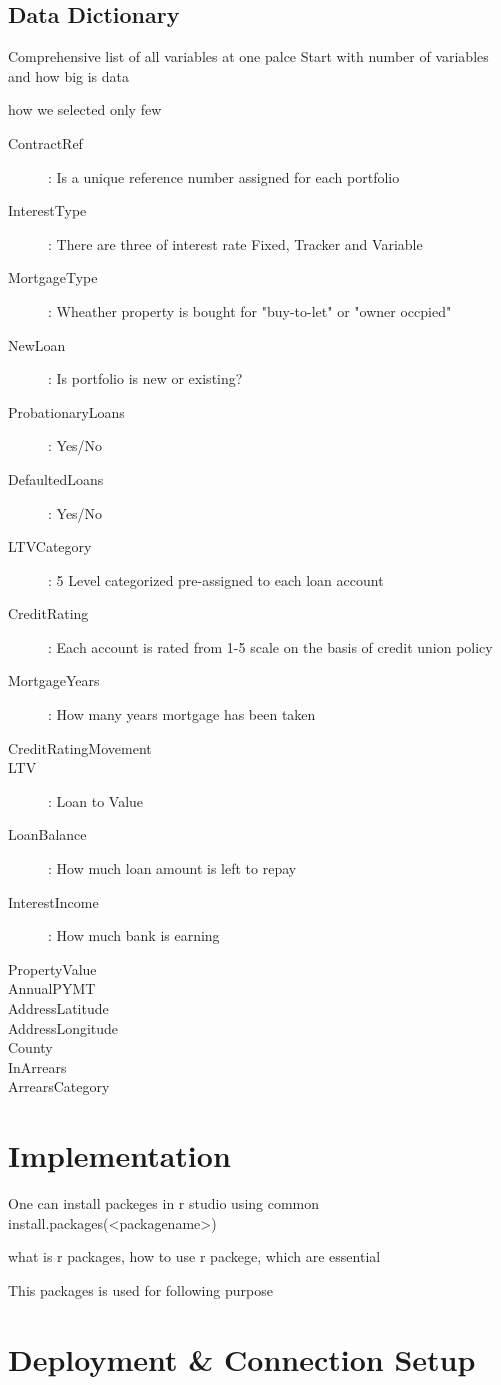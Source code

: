 \subsection{Data Dictionary}

Comprehensive list of all variables at one palce
Start with number of variables and how big is data


how we selected only  few

\begin{description}
  \item[ContractRef]: Is a unique reference number assigned for each portfolio
  \item[InterestType]: There are three of interest rate Fixed, Tracker and Variable
  \item[MortgageType]: Wheather property is bought for "buy-to-let" or "owner occpied"
  \item[NewLoan]: Is portfolio is new or existing?
  \item[ProbationaryLoans]: Yes/No
  \item[DefaultedLoans]: Yes/No
  \item[LTVCategory]: 5 Level categorized pre-assigned to each loan account
  \item[CreditRating]: Each account is rated from 1-5 scale on the basis of credit union policy
  \item[MortgageYears]: How many years mortgage has been taken
  \item[CreditRatingMovement]
  \item[LTV]: Loan to Value 
  \item[LoanBalance]: How much loan amount is left to repay
  \item[InterestIncome]: How much bank is earning 
  \item[PropertyValue]
  \item[AnnualPYMT]
  \item[AddressLatitude]
  \item[AddressLongitude]
  \item[County]
  \item[InArrears]
  \item[ArrearsCategory]
\end{description}


\section{Implementation}\label{}

One can install packeges in r studio using common  install.packages(<packagename>)

what is r packages, how to use r packege, which are essential

This packages is used for following purpose
\section{Deployment \& Connection Setup}

